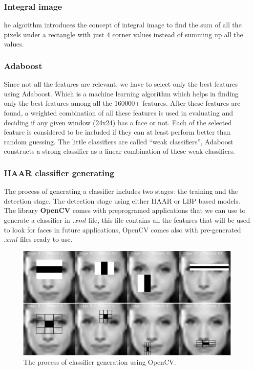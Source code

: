 \documentclass[a4paper,12pt]{report}
\begin{document}

\subsubsection{Integral image}
      he  algorithm  introduces  the 
      concept of integral image to find the sum of all the pixels under a rectangle with just 4 corner values instead of 
      summing  up all the values.

\subsubsection{Adaboost}
      Since not all the features are relevant, we have to select only the best features using Adaboost. Which is  a  machine  learning  algorithm  which  helps  in  finding  only  the  best  features  among  all  the 
      160000+ features. After  these  features  are  found,  a  weighted  combination  of  all  these  features  is  used  in 
      evaluating  and  deciding  if  any  given  window  (24x24)  has  a  face  or  not.  Each  of  the  selected  feature  is 
      considered to be included if they can at least perform better than random guessing. The little classifiers are called ``weak classifiers'', Adaboost  constructs  a  strong  classifier  as  a  linear 
      combination of these weak classifiers.

\subsubsection{HAAR classifier generating}
      The process of generating a classifier includes two stages: the training and the detection stage. The detection stage using either HAAR or LBP based models. The library \textbf{OpenCV} comes with preprogramed applications that we can use to generate a classifier in $.xml$ file, this file contains all the features that will be used to look for faces in future applications, OpenCV comes also with pre-generated $.xml$ files ready to use.

      \begin{figure}[h]
	\centering
	\caption{\label{haar_stage_vis} The process of classifier generation using OpenCV.}
	\includegraphics[scale=0.5]{haar_stage_vis.png}
      \end{figure}
\end{document}

